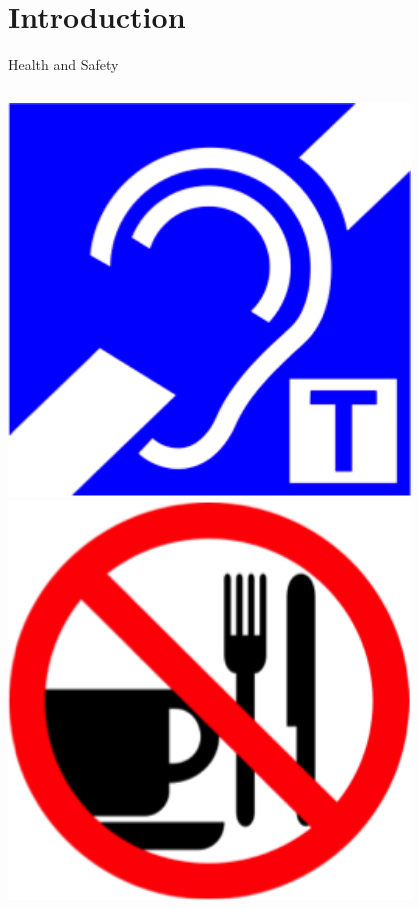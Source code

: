 \part{Introduction}
\begin{frame}
\partpage
\end{frame}


\begin{frame}{Health and Safety}
\begin{columns}[c]
\begin{column}{0.33\textwidth}
\begin{center}
\includegraphics[width=0.8\textwidth,height=0.5\textheight,keepaspectratio]{imgs/health-safety-1.png}\\
\includegraphics[width=0.8\textwidth,height=0.5\textheight,keepaspectratio]{imgs/health-safety-4.png}

\end{center}
\end{column}
\end{columns}
\end{frame}
